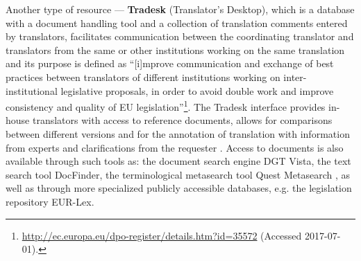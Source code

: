 \documentclass[output=paper]{langsci/langscibook}
\begin{document}
Another type of resource — \textbf{Tradesk} (Translator’s Desktop), which is a database with a document handling tool and a collection of translation comments entered by translators, facilitates communication between the coordinating translator and translators from the same or other institutions working on the same translation and its purpose is defined as “[i]mprove communication and exchange of best practices between translators of different institutions working on inter-institutional legislative proposals, in order to avoid double work and improve consistency and quality of EU legislation”\footnote{\url{http://ec.europa.eu/dpo-register/details.htm?id=35572} (Accessed 2017-07-01).}. The Tradesk interface provides in-house translators with access to reference documents, allows for comparisons between different versions and for the annotation of translation with information from experts and clarifications from the requester \citep{Trousil2017}. Access to documents is also available through such tools as: the document search engine DGT Vista, the text search tool DocFinder, the terminological metasearch tool Quest Metasearch \citep{Trousil2017}, as well as through more specialized publicly accessible databases, e.g. the legislation repository EUR-Lex. 
\end{document}
